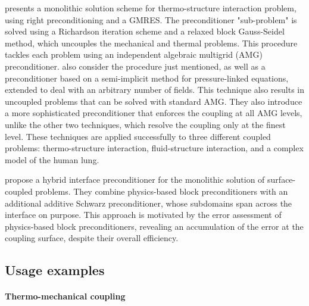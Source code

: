 \cite{danowski_monolithic_2013} presents a monolithic solution scheme for thermo-structure interaction problem, using right preconditioning and a GMRES.
The preconditioner "sub-problem" is solved using a Richardson iteration scheme and a relaxed block Gauss-Seidel method, which uncouples the mechanical and thermal problems.
This procedure tackles each problem using an independent algebraic multigrid (AMG) preconditioner.
\cite{verdugo_unified_2016} also consider the procedure just mentioned, as well as a preconditioner based on a semi-implicit method for pressure-linked equations, extended to deal with an arbitrary number of fields.
This technique also results in uncoupled problems that can be solved with standard AMG.
They also introduce a more sophisticated preconditioner that enforces the coupling at all AMG levels, unlike the other two techniques, which resolve the coupling only at the finest level.
These techniques are applied successfully to three different coupled problems: thermo-structure interaction, fluid-structure interaction, and a complex model of the human lung.

\cite{mayr_hybrid_2020} propose a hybrid interface preconditioner for the monolithic solution of surface-coupled problems.
They combine physics-based block preconditioners with an additional additive Schwarz preconditioner, whose subdomains span across the interface on purpose.
This approach is motivated by the error assessment of physics-based block preconditioners, revealing an accumulation of the error at the coupling surface, despite their overall efficiency.

\newpage


\subsection{Usage examples}

\paragraph{Thermo-mechanical coupling}

